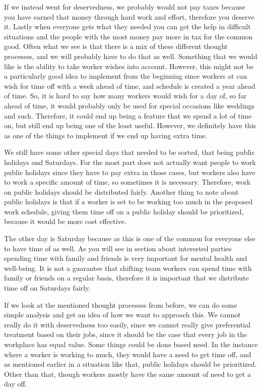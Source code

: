 If we instead went for deservedness, we probably would not pay taxes because you have earned that money through hard work and effort, therefore you deserve it. 
Lastly when everyone gets what they needed you can get the help in difficult situations and the people with the most money pay more in tax for the common good.
Often what we see is that there is a mix of these different thought processes, and we will probably have to do that as well. 
Something that we would like is the ability to take worker wishes into account. However, this might not be a particularly good idea to implement from the beginning since workers at \siemens can wish for time off with a week ahead of time, and schedule is created a year ahead of time. So, it is hard to say how many workers would wish for a day of, so far ahead of time, it would probably only be used for special occasions like weddings and such. Therefore, it could end up being a feature that we spend a lot of time on, but still end up being one of the least useful. However, we definitely have this as one of the things to implement if we end up having extra time. 

We still have some other special days that needed to be sorted, that being public holidays and Saturdays. For the most part \siemens does not actually want people to work public holidays since they have to pay extra in those cases, but workers also have to work a specific amount of time, so sometimes it is necessary. Therefore, work on public holidays should be distributed fairly. Another thing to note about public holidays is that if a worker is set to be working too much in the proposed work schedule, giving them time off on a public holiday should be prioritized, because it would be more cost effective. 

The other day is Saturday because as this is one of the common for everyone else to have time of as well. As you will see in section about interested parties spending time with family and friends is very important for mental health and well-being. It is not a guarantee that shifting team workers can spend time with family or friends on a regular basis, therefore it is important that we distribute time off on Saturdays fairly. 

If we look at the mentioned thought processes from before, we can do some simple analysis and get an idea of how we want to approach this. 
We cannot really do it with deservedness too easily, since we cannot really give preferential treatment based on their jobs, since it should be the case that every job in the workplace has equal value.
Some things could be done based need. In the instance where a worker is working to much, they would have a need to get time off, and as mentioned earlier in a situation like that, public holidays should be prioritized. Other than that, though workers mostly have the same amount of need to get a day off. 

